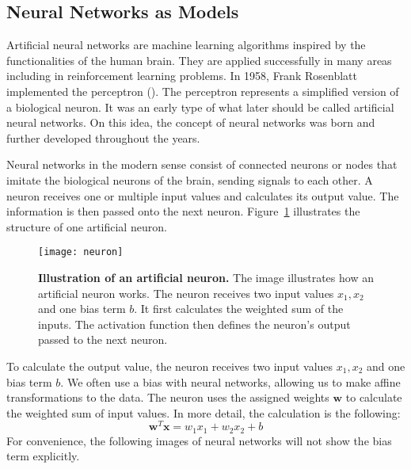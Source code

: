 
\subsection{Neural Networks as Models}
\label{subsec:NN}
Artificial neural networks are machine learning algorithms inspired by the functionalities of the human brain. They are applied successfully in many areas including in reinforcement learning problems. In 1958, Frank Rosenblatt implemented the perceptron (\cite{rosenblatt1958perceptron}). The perceptron represents a simplified version of a biological neuron. It was an early type of what later should be called artificial neural networks. On this idea, the concept of neural networks was born and further developed throughout the years.

Neural networks in the modern sense consist of connected neurons or nodes that imitate the biological neurons of the brain, sending signals to each other. A neuron receives one or multiple input values and calculates its output value. The information is then passed onto the next neuron. Figure~\ref{fig:neuron} illustrates the structure of one artificial neuron.
\begin{figure}[ht]
\centering
\texttt{[image: neuron]}
\caption[Illustration of an artificial neuron]{
  \textbf{Illustration of an artificial neuron.}
  The image illustrates how an artificial neuron works. The neuron receives two input values $x_1, x_2$ and one bias term $b$. It first calculates the weighted sum of the inputs. The activation function then defines the neuron's output passed to the next neuron.
}
\label{fig:neuron}
\end{figure}
To calculate the output value, the neuron receives two input values $x_1, x_2$ and one bias term $b$. We often use a bias with neural networks, allowing us to make affine transformations to the data. The neuron uses the assigned weights $\mathbf{w}$ to calculate the weighted sum of input values. In  more detail, the calculation is the following:
\[
  \mathbf{w}^T \mathbf{x} = w_1 x_1 + w_2 x_2 + b
\]
For convenience, the following images of neural networks will not show the bias term explicitly.

